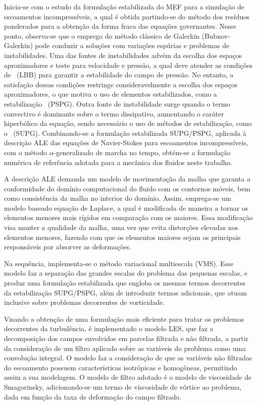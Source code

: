 Inicia-se com o estudo da formulação estabilizada do MEF para a simulação de escoamentos incompressíveis, a qual é obtida partindo-se do método dos resíduos ponderados para a obtenção da forma fraca das equações governantes. Nesse ponto, observa-se que o emprego do método clássico de Galerkin (Bubnov-Galerkin) pode conduzir a soluções com variações espúrias e problemas de instabilidades. Uma das fontes de instabilidades advém da escolha dos espaços aproximadores e teste para velocidade e pressão, a qual deve atender as condições de \LBB\ (LBB) para garantir a estabilidade do campo de pressão. No entanto, a satisfação dessas condições restringe consideravelmente a escolha dos espaços aproximadores, o que motiva o uso de elementos estabilizados, como a estabilização \PSPG\ (PSPG). Outra fonte de instabilidade surge quando o termo convectivo é dominante sobre o termo dissipativo, aumentando o caráter hiperbólico da equação, sendo necessário o uso de métodos de estabilização, como o \SUPG\ (SUPG). Combinando-se a formulação estabilizada SUPG/PSPG, aplicada à descrição ALE das equações de Navier-Stokes para escoamentos incompressíveis, com o método $\alpha$-generalizado de marcha no tempo, obtém-se a formulação numérica de referência adotada para a mecânica dos fluidos neste trabalho.

A descrição ALE demanda um modelo de movimentação da malha que garanta a conformidade do domínio computacional do fluido com os contornos móveis, bem como consistência da malha no interior do domínio. Assim, emprega-se um modelo baseado equação de Laplace, a qual é modificada de maneira a tornar os elementos menores mais rígidos em comparação com os maiores. Essa modificação visa manter a qualidade da malha, uma vez que evita distorções elevadas nos elementos menores, fazendo com que os elementos maiores sejam os principais responsáveis por absorver as deformações.

Na sequência, implementa-se o método variacional multiescala (VMS). Esse modelo faz a separação das grandes escalas do problema das pequenas escalas, e produz uma formulação estabilizada que engloba os mesmos termos decorrentes da estabilização SUPG/PSPG, além de introduzir termos adicionais, que atuam inclusive sobre problemas decorrentes de vorticidade.

Visando a obtenção de uma formulação mais eficiente para tratar os problemas decorrentes da turbulência, é implementado o modelo LES, que faz a decomposição dos campos envolvidos em parcelas filtrada e não filtrada, a partir da consideração de um filtro aplicado sobre as variáveis do problema como uma convolução integral. O modelo faz a consideração de que as variáveis não filtradas do escoamento possuem características isotrópicas e homogêneas, permitindo assim a sua modelagem. O modelo de filtro adotado é o modelo de viscosidade de Smagorinsky, adicionando-se um termo de viscosidade de vórtice ao problema, dada em função da taxa de deformação do campo filtrado.

